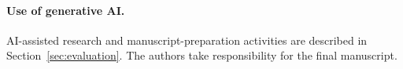 \paragraph{Use of generative AI.}
AI-assisted research and manuscript-preparation activities are described in Section~\ref{sec:evaluation}. The authors take responsibility for the final manuscript.

\clearpage
\appendix




\ifdefined{}

\fi
\clearpage


